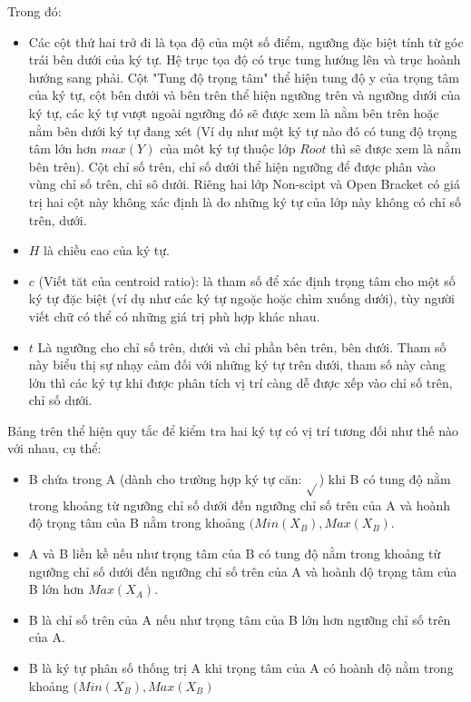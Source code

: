 \documentclass[a4paper,12pt]{article}
\begin{document}
	Trong đó:
	\begin{itemize}
		\item Các cột thứ hai trở đi là tọa độ của một số điểm, ngưỡng đặc biệt tính từ góc trái bên dưới của ký tự. Hệ trục tọa độ có trục tung hướng lên và trục hoành hướng sang phải. Cột "Tung độ trọng tâm" thể hiện tung độ y của trọng tâm của ký tự, cột bên dưới và bên trên thể hiện ngưỡng trên và ngưỡng dưới của ký tự, các ký tự vượt ngoài ngưỡng đó sẽ được xem là nằm bên trên hoặc nằm bên dưới ký tự đang xét (Ví dụ như một ký tự nào đó có tung độ trọng tâm lớn hơn $max(Y)$ của môt ký tự thuộc lớp $Root$ thì sẽ được xem là nằm bên trên). Cột chỉ số trên, chỉ số dưới thể hiện ngưỡng để được phân vào vùng chỉ số trên, chỉ sô dưới. Riêng hai lớp Non-scipt và Open Bracket có giá trị hai cột này không xác định là do những ký tự của lớp này không có chỉ số trên, dưới.
		\item $H$ là chiều cao của ký tự.
		\item $c$ (Viết tăt của centroid ratio): là tham số để xác định trọng tâm cho một số ký tự đặc biệt (ví dụ như các ký tự ngoặc hoặc chìm xuống dưới), tùy người viết chữ có thể có những giá trị phù hợp khác nhau.
		\item $t$ Là ngưỡng cho chỉ số trên, dưới và chỉ phần bên trên, bên dưới. Tham số này biểu thị sự nhạy cảm đối với những ký tự trên dưới, tham số này càng lớn thì các ký tự khi được phân tích vị trí càng dễ được xếp vào chỉ số trên, chỉ số dưới.
	\end{itemize}
	
	Bảng trên thể hiện quy tắc để kiểm tra hai ký tự có vị trí tương đối như thế nào với nhau, cụ thể:
	\begin{itemize}
		
		\item B chứa trong A (dành cho trường hợp ký tự căn: $\sqrt{}$) khi B có tung độ nằm trong khoảng từ ngưỡng chỉ số dưới đến ngưỡng chỉ số trên của A và hoành độ trọng tâm của B nằm trong khoảng $(Min(X_B), Max(X_B)$.
		
		\item A và B liền kề nếu như trọng tâm của B có tung độ nằm trong khoảng từ ngưỡng chỉ số dưới đến ngưỡng chỉ số trên của A và hoành độ trọng tâm của B lớn hơn $Max(X_A)$.
		
		\item B là chỉ số trên của A nếu như trọng tâm của B lớn hơn ngưỡng chỉ số trên của A.
		
		\item B là ký tự phân số thống trị A khi trọng tâm của A có hoành độ nằm trong khoảng $(Min(X_B), Max(X_B)$
		
	\end{itemize}
	
\end{document}
